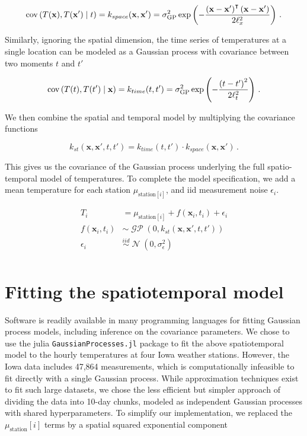 \documentclass[letter]{article}
\newcommand{\genericdel}[3]{%
      \left#1#3\right#2
    }
\newcommand{\del}[1]{\genericdel(){#1}}
\newcommand{\sbr}[1]{\genericdel[]{#1}}
\DeclareMathOperator{\cov}{{cov}}
\DeclareMathOperator{\normal}{\mathcal{N}}
\DeclareMathOperator{\GP}{\mathcal{GP}}
\newcommand{\station}[1]{\mathrm{station}\sbr{#1}}
\newcommand{\xvec}{\mathbf{x}}
\newcommand{\iid}{iid}
\newcommand{\trans}{^{\intercal}}
\newcommand{\sigmaf}{\sigma_{\mathrm{GP}}}
\newcommand{\sigman}{\sigma_{\epsilon}}
\begin{document}
\begin{equation}
    \cov\del{T(\xvec), T(\xvec') \mid t} = k_{space}(\xvec, \xvec') = \sigmaf^2 \exp\del{-\frac{\del{\xvec-\xvec'}\trans\del{\xvec-\xvec'}}{2\ell_x^2}}\,.
\end{equation}

Similarly, ignoring the spatial dimension, the time series of
temperatures at a single location can be modeled as a Gaussian process
with covariance between two moments \(t\) and \(t'\)

\begin{equation}
\cov\del{T(t), T(t') \mid \xvec} = k_{time}(t, t') = \sigmaf^2 \exp\del{-\frac{\del{t-t'}^2}{2\ell_t^2}}\,.
\end{equation}

We then combine the spatial and temporal model by multiplying the
covariance functions

\begin{equation}
k_{st}(\xvec,\xvec',t,t') = k_{time}(t,t') \cdot k_{space}(\xvec, \xvec')\,.
\end{equation}

This gives us the covariance of the Gaussian process underlying the full
spatio-temporal model of temperatures. To complete the model
specification, we add a mean temperature for each station
\(\mu_{\station{i}}\), and iid measurement noise \(\epsilon_i\).

\begin{align}
    T_i &= \mu_{\station{i}} + f(\xvec_i, t_i) + \epsilon_i\\
    f(\xvec_i, t_i) &\sim \GP\del{0, k_{st}(\xvec,\xvec',t,t')}\\
    \epsilon_i &\overset{\iid}{\sim} \normal\del{0,\sigman^2}\\
\end{align}
    


    	\section{Fitting the spatiotemporal
model}\label{fitting-the-spatiotemporal-model}

Software is readily available in many programming languages for fitting
Gaussian process models, including inference on the covariance
parameters. We chose to use the julia \texttt{GaussianProcesses.jl}
package to fit the above spatiotemporal model to the hourly temperatures
at four Iowa weather stations. However, the Iowa data includes 47,864
measurements, which is computationally infeasible to fit directly with a
single Gaussian process. While approximation techniques exist to fit
such large datasets, we chose the less efficient but simpler approach of
dividing the data into 10-day chunks, modeled as independent Gaussian
processes with shared hyperparameters. To simplify our implementation,
we replaced the \(\mu_\station{i}\) terms by a spatial squared
exponential component
\end{document}
